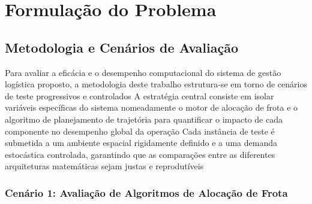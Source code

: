 \chapter{Formulação do Problema}\label{cap:metodology}

\section{Metodologia e Cenários de Avaliação}

Para avaliar a eficácia e o desempenho computacional do sistema de gestão logística proposto, a metodologia deste trabalho estrutura-se em torno de cenários de teste progressivos e controlados %
A estratégia central consiste em isolar variáveis específicas do sistema nomeadamente o motor de alocação de frota e o algoritmo de planejamento de trajetória para quantificar o impacto de cada componente no desempenho global da operação %
Cada instância de teste é submetida a um ambiente espacial rigidamente definido e a uma demanda estocástica controlada, garantindo que as comparações entre as diferentes arquiteturas matemáticas sejam justas e reprodutíveis %

\subsection{Cenário 1: Avaliação de Algoritmos de Alocação de Frota}

